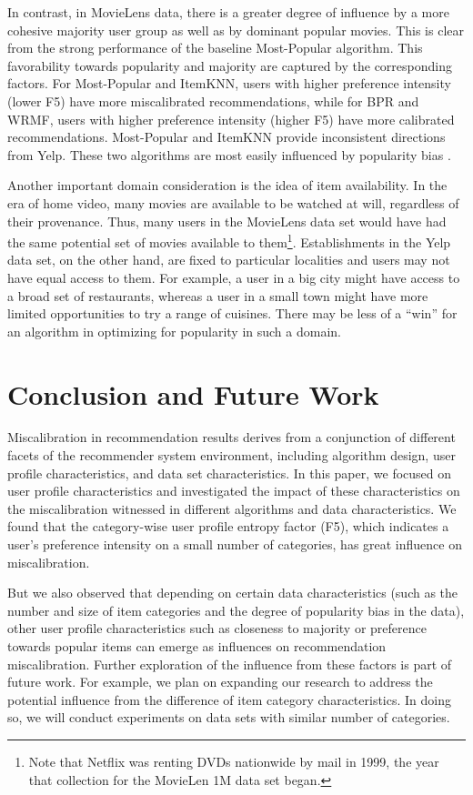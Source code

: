 In contrast, in MovieLens data, there is a greater degree of influence by a more cohesive majority user group as well as by dominant popular movies. This is clear from the strong performance of the baseline Most-Popular algorithm. This favorability towards popularity and majority are captured by the corresponding factors. For Most-Popular and ItemKNN, users with higher preference intensity (lower F5) have more miscalibrated recommendations, while for BPR and WRMF, users with higher preference intensity (higher F5) have more calibrated recommendations. Most-Popular and ItemKNN provide inconsistent directions from Yelp. These two algorithms are most easily influenced by popularity bias \cite{jannach2015recommenders}.

Another important domain consideration is the idea of item availability. In the era of home video, many movies are available to be watched at will, regardless of their provenance. Thus, many users in the MovieLens data set would have had the same potential set of movies available to them\footnote{Note that Netflix was renting DVDs nationwide by mail in 1999, the year that collection for the MovieLen 1M data set began.}. Establishments in the Yelp data set, on the other hand, are fixed to particular localities and users may not have equal access to them. For example, a user in a big city might have access to a broad set of restaurants, whereas a user in a small town might have more limited opportunities to try a range of cuisines. There may be less of a ``win'' for an algorithm in optimizing for popularity in such a domain.


\section{Conclusion and Future Work}

Miscalibration in recommendation results derives from a conjunction of different facets of the recommender system environment, including algorithm design, user profile characteristics, and data set characteristics. In this paper, we focused on user profile characteristics and investigated the impact of these characteristics on the miscalibration witnessed in different algorithms and data characteristics. We found that the category-wise user profile entropy factor (F5), which indicates a user's preference intensity on a small number of categories, has great influence on miscalibration. 
 
But we also observed that depending on certain data characteristics (such as the number and size of item categories and the degree of popularity bias in the data), other user profile characteristics such as closeness to majority or preference towards popular items can emerge as influences on recommendation miscalibration. Further exploration of the influence from these factors is part of future work. For example, we plan on expanding our research to address the potential influence from the difference of item category characteristics. In doing so, we will conduct experiments on data sets with similar  number of categories.
 
